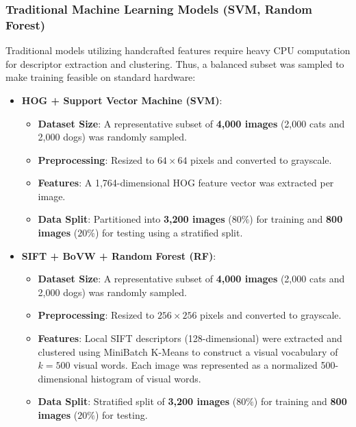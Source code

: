 \documentclass[12pt,a4paper]{article}
\begin{document}
\subsubsection{Traditional Machine Learning Models (SVM, Random Forest)}
Traditional models utilizing handcrafted features require heavy CPU computation for descriptor extraction and clustering. Thus, a balanced subset was sampled to make training feasible on standard hardware:
\begin{itemize}
    \item \textbf{HOG + Support Vector Machine (SVM)}:
    \begin{itemize}
        \item \textbf{Dataset Size}: A representative subset of \textbf{4,000 images} (2,000 cats and 2,000 dogs) was randomly sampled.
        \item \textbf{Preprocessing}: Resized to $64 \times 64$ pixels and converted to grayscale.
        \item \textbf{Features}: A 1,764-dimensional HOG feature vector was extracted per image.
        \item \textbf{Data Split}: Partitioned into \textbf{3,200 images} ($80\%$) for training and \textbf{800 images} ($20\%$) for testing using a stratified split.
    \end{itemize}
    \item \textbf{SIFT + BoVW + Random Forest (RF)}:
    \begin{itemize}
        \item \textbf{Dataset Size}: A representative subset of \textbf{4,000 images} (2,000 cats and 2,000 dogs) was randomly sampled.
        \item \textbf{Preprocessing}: Resized to $256 \times 256$ pixels and converted to grayscale.
        \item \textbf{Features}: Local SIFT descriptors (128-dimensional) were extracted and clustered using MiniBatch K-Means to construct a visual vocabulary of $k = 500$ visual words. Each image was represented as a normalized 500-dimensional histogram of visual words.
        \item \textbf{Data Split}: Stratified split of \textbf{3,200 images} ($80\%$) for training and \textbf{800 images} ($20\%$) for testing.
    \end{itemize}
\end{itemize}
\end{document}
